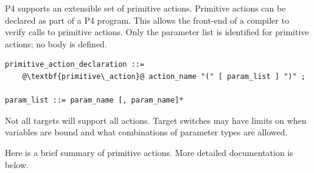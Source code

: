 \documentclass[12pt]{article}
\begin{document}

P4 supports an extensible set of primitive actions.  Primitive actions can 
be declared as part of a P4 program. This allows the front-end of a compiler 
to verify calls to primitive actions. Only the parameter list is identified 
for primitive actions; no body is defined. 

\begin{lstlisting}[frame=single,backgroundcolor=\color{bnfgreen},escapechar=\@]
primitive_action_declaration ::= 
    @\textbf{primitive\_action}@ action_name "(" [ param_list ] ")" ;

param_list ::= param_name [, param_name]*
\end{lstlisting}

Not all targets will support all actions. Target switches may have
limits on when variables are bound and what combinations of parameter
types are allowed.

Here is a brief summary of primitive actions. More detailed documentation 
is below.
\end{document}
